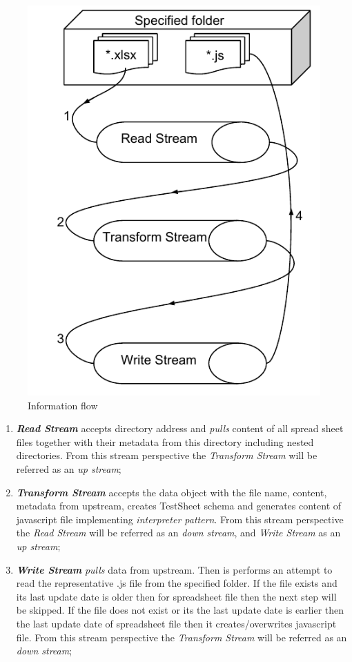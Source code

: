 \begin{figure}[ht]
	\label{fig:tsGenArch}
	\centering
	\includegraphics[scale=0.75]{grafiken/TSGeneratorArchitecture}
	\caption{Information flow}
\end{figure}

\begin{enumerate}
	\item \textbf{\textit{Read Stream}} accepts directory address and \textit{pulls} content of all spread sheet files together with their metadata  from this directory including nested directories. From this stream perspective the \textit{Transform Stream} will be referred as an \textit{up stream};
	\item \textbf{\textit{Transform Stream}} accepts the data object with the file name, content, metadata from upstream, creates TestSheet schema and generates content of javascript file implementing \textit{interpreter pattern}. From this stream perspective the \textit{Read Stream} will be referred as an \textit{down stream}, and \textit{Write Stream} as an \textit{up stream}; 
	\item \textbf{\textit{Write Stream}} \textit{pulls} data from upstream. Then is performs an attempt to read the representative .js file from the  specified folder. If the file exists and its last update date is older then for spreadsheet file then the next step will be skipped. If the file does not exist or its the last update date is earlier then the last update date of spreadsheet file then it creates/overwrites javascript file. From this stream perspective the \textit{Transform Stream} will be referred as an \textit{down stream};
\end{enumerate}

